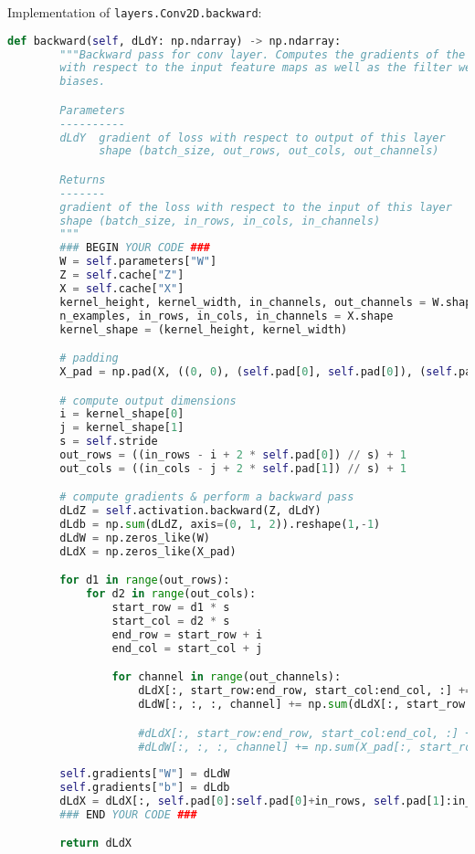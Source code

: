 Implementation of \texttt{layers.Conv2D.backward}:

\begin{lstlisting}[language=Python]
    def backward(self, dLdY: np.ndarray) -> np.ndarray:
        """Backward pass for conv layer. Computes the gradients of the output
        with respect to the input feature maps as well as the filter weights and
        biases.

        Parameters
        ----------
        dLdY  gradient of loss with respect to output of this layer
              shape (batch_size, out_rows, out_cols, out_channels)

        Returns
        -------
        gradient of the loss with respect to the input of this layer
        shape (batch_size, in_rows, in_cols, in_channels)
        """
        ### BEGIN YOUR CODE ###
        W = self.parameters["W"]
        Z = self.cache["Z"]
        X = self.cache["X"]
        kernel_height, kernel_width, in_channels, out_channels = W.shape
        n_examples, in_rows, in_cols, in_channels = X.shape
        kernel_shape = (kernel_height, kernel_width)

        # padding
        X_pad = np.pad(X, ((0, 0), (self.pad[0], self.pad[0]), (self.pad[1], self.pad[1]), (0, 0)), mode='constant')

        # compute output dimensions
        i = kernel_shape[0]
        j = kernel_shape[1]
        s = self.stride
        out_rows = ((in_rows - i + 2 * self.pad[0]) // s) + 1
        out_cols = ((in_cols - j + 2 * self.pad[1]) // s) + 1

        # compute gradients & perform a backward pass
        dLdZ = self.activation.backward(Z, dLdY)
        dLdb = np.sum(dLdZ, axis=(0, 1, 2)).reshape(1,-1)
        dLdW = np.zeros_like(W)
        dLdX = np.zeros_like(X_pad)

        for d1 in range(out_rows):
            for d2 in range(out_cols):
                start_row = d1 * s
                start_col = d2 * s
                end_row = start_row + i
                end_col = start_col + j

                for channel in range(out_channels):
                    dLdX[:, start_row:end_row, start_col:end_col, :] += W[np.newaxis, :, :, :, channel] * dLdZ[:, d1:d1+1, d2:d2+1, np.newaxis, channel]
                    dLdW[:, :, :, channel] += np.sum(dLdX[:, start_row:end_row, start_col:end_col, :] * dLdZ[:, d1:d1+1, d2:d2+1, np.newaxis, channel], axis=0)

                    #dLdX[:, start_row:end_row, start_col:end_col, :] += W[:, :, :, channel] * dLdZ[:, d1, d2, channel]
                    #dLdW[:, :, :, channel] += np.sum(X_pad[:, start_row:end_row, start_col:end_col, :] * dLdZ[:, d1, d2, channel], axis=0)
        
        self.gradients["W"] = dLdW
        self.gradients["b"] = dLdb
        dLdX = dLdX[:, self.pad[0]:self.pad[0]+in_rows, self.pad[1]:in_cols+self.pad[1], :]
        ### END YOUR CODE ###

        return dLdX

\end{lstlisting}


